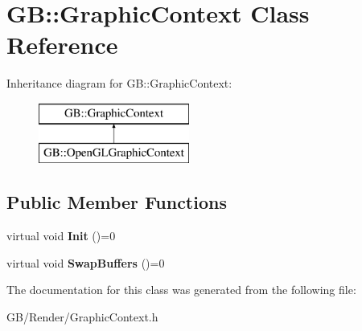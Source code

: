 \hypertarget{class_g_b_1_1_graphic_context}{}\section{GB\+::Graphic\+Context Class Reference}
\label{class_g_b_1_1_graphic_context}
Inheritance diagram for GB\+::Graphic\+Context\+:\begin{figure}[H]
\begin{center}
\leavevmode
\includegraphics[height=2.000000cm]{class_g_b_1_1_graphic_context}
\end{center}
\end{figure}
\subsection*{Public Member Functions}
\begin{DoxyCompactItemize}
\item 
\mbox{\label{class_g_b_1_1_graphic_context_ab24021679179b6d2e927c51edb186982}} 
virtual void {\bfseries Init} ()=0
\item 
\mbox{\label{class_g_b_1_1_graphic_context_ac6e4d88ccf006f8b5d8d19f174962e88}} 
virtual void {\bfseries Swap\+Buffers} ()=0
\end{DoxyCompactItemize}


The documentation for this class was generated from the following file\+:\begin{DoxyCompactItemize}
\item 
G\+B/\+Render/Graphic\+Context.\+h\end{DoxyCompactItemize}
